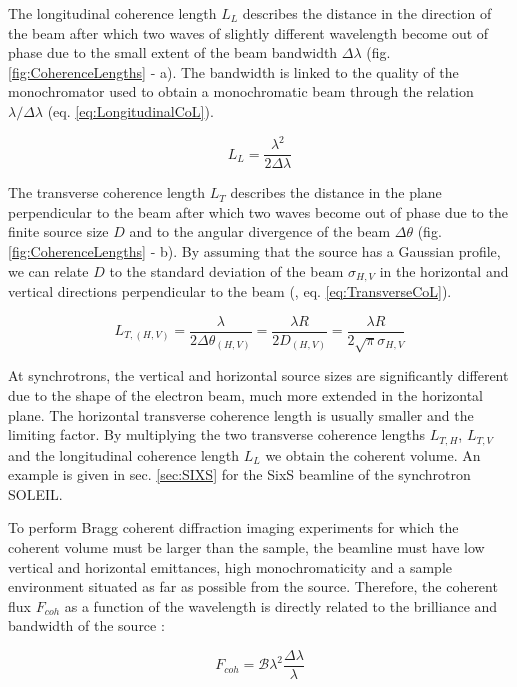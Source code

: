 The longitudinal coherence length $L_L$ describes the distance in the direction of the beam after which two waves of slightly different wavelength become out of phase due to the small extent of the beam bandwidth $\Delta\lambda$ (fig. \ref{fig:CoherenceLengths} - a).
The bandwidth is linked to the quality of the monochromator used to obtain a monochromatic beam through the relation $\lambda/\Delta\lambda$ (eq. \ref{eq:LongitudinalCoL}).

\begin{equation}
    \label{eq:LongitudinalCoL}
    L_L = \frac{\lambda^2}{2\Delta\lambda}
\end{equation}

The transverse coherence length $L_T$ describes the distance in the plane perpendicular to the beam after which two waves become out of phase due to the finite source size $D$ and to the angular divergence of the beam $\Delta\theta$ (fig. \ref{fig:CoherenceLengths} - b).
By assuming that the source has a Gaussian profile, we can relate $D$ to the standard deviation of the beam $\sigma_{H, V}$ in the horizontal and vertical directions perpendicular to the beam (\cite{Willmott}, eq. \ref{eq:TransverseCoL}).

\begin{equation}
    \label{eq:TransverseCoL}
    L_{T,(H, V)} = \frac{\lambda}{2\Delta\theta_{(H, V)}} = \frac{\lambda R}{2 D_{(H, V)}} = \frac{\lambda R}{2\sqrt{\pi}\sigma_{H, V}}
\end{equation}

At synchrotrons, the vertical and horizontal source sizes are significantly different due to the shape of the electron beam, much more extended in the horizontal plane.
The horizontal transverse coherence length is usually smaller and the limiting factor.
By multiplying the two transverse coherence lengths $L_{T,H}$, $L_{T,V}$ and the longitudinal coherence length $L_L$ we obtain the coherent volume.
An example is given in sec. \ref{sec:SIXS} for the SixS beamline of the synchrotron SOLEIL.

To perform Bragg coherent diffraction imaging experiments for which the coherent volume must be larger than the sample, the beamline must have low vertical and horizontal emittances, high monochromaticity and a sample environment situated as far as possible from the source.
Therefore, the coherent flux $F_{coh}$ as a function of the wavelength is directly related to the brilliance and bandwidth of the source \parencite{Willmott}:

\begin{equation}
    \label{eq:CoherentFlux}
    F_{coh} = \mathcal{B} \lambda^2 \frac{\Delta \lambda}{\lambda}
\end{equation}

